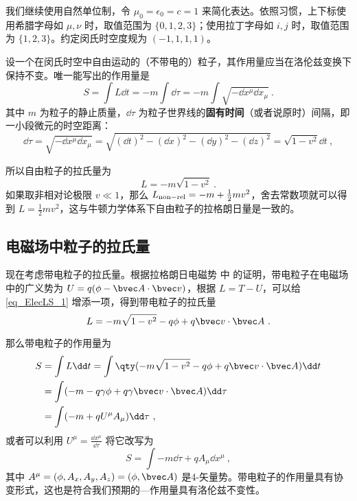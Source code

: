 
我们继续使用自然单位制，令 $\mu_0=\epsilon_0=c=1$ 来简化表达。依照习惯，上下标使用希腊字母如 $\mu, \nu$ 时，取值范围为 $\{0, 1, 2, 3\}$；使用拉丁字母如 $i, j$ 时，取值范围为 $\{1, 2, 3\}$。约定闵氏时空度规为 $(-1,1,1,1)$。

设一个在闵氏时空中自由运动的（不带电的）粒子，其作用量应当在洛伦兹变换下保持不变。唯一能写出的作用量是
\begin{equation}
S=\int L\dd t=-m\int \dd \tau=-m\int \sqrt{-\dd x^\mu \dd x_\mu}~.
\end{equation}
其中 $m$ 为粒子的静止质量，$\dd \tau$ 为粒子世界线的\textbf{固有时间}（或者说原时）间隔，即一小段微元的时空距离：
\begin{equation}
\dd \tau=\sqrt{-\dd x^\mu\dd x_\mu}=\sqrt{(\dd t)^2-(\dd x)^2-(\dd y)^2-(\dd z)^2}=\sqrt{1-v^2}\dd t~,
\end{equation}

所以自由粒子的拉氏量为
\begin{equation}\label{eq_ElecLS_1}
L=-m\sqrt{1-v^2}~.
\end{equation}
如果取非相对论极限 $v\ll 1$，那么 $L_{\rm{non-rel}}=-m+\frac{1}{2}mv^2$，舍去常数项就可以得到 $L=\frac{1}{2}mv^2$，这与牛顿力学体系下自由粒子的拉格朗日量是一致的。
\subsection{电磁场中粒子的拉氏量}
现在考虑带电粒子的拉氏量。根据拉格朗日电磁势 中  的证明，带电粒子在电磁场中的广义势为 $U=q(\phi-\bvec A\cdot \bvec v)$，根据 $L=T-U$，可以给\autoref{eq_ElecLS_1} 增添一项，得到带电粒子的拉氏量
\begin{equation}\label{eq_ElecLS_2}
L=-m\sqrt{1-v^2}-q\phi+q\bvec v\cdot \bvec A~.
\end{equation}

那么带电粒子的作用量为
\begin{equation}\label{eq_ElecLS_3}
\begin{aligned}
S&=\int L\dd t=\int \qty(-m\sqrt{1-v^2}-q\phi +q\bvec v\cdot \bvec A)\dd t\\
&=\int (-m-q\gamma\phi+q\gamma\bvec v\cdot \bvec A)\dd \tau\\
&=\int (-m+qU^\mu A_\mu)\dd \tau~,
\end{aligned}
\end{equation}
或者可以利用 $U^\mu= \frac{\dd x^\mu}{\dd \tau}$ 将它改写为
\begin{equation}\label{eq_ElecLS_4}
S=\int -m\dd \tau+qA_\mu \dd x^\mu~,
\end{equation}
其中 $A^\mu=(\phi,A_x,A_y,A_z)=(\phi,\bvec A)$ 是4-矢量势。带电粒子的作用量具有协变形式，这也是符合我们预期的—作用量具有洛伦兹不变性。

